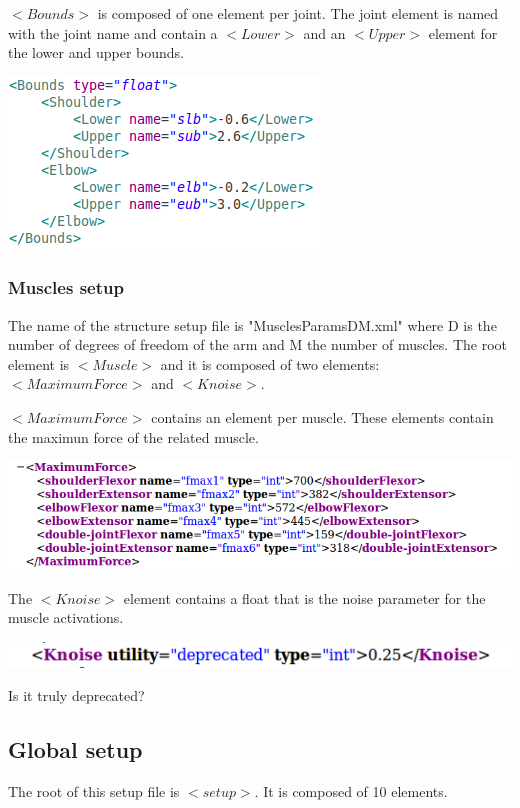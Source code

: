 \documentclass[a4paper]{article}
\begin{document}
$<Bounds>$ is composed of one element per joint. The joint element is named with the joint name and contain a $<Lower>$ and an $<Upper>$ element for the lower and upper bounds.
\begin{flushleft}
\includegraphics[scale=0.5]{XMLBounds.png}
\end{flushleft}
\subsubsection{Muscles setup}
The name of the structure setup file is "MusclesParamsDM.xml" where D is the number of degrees of freedom of the arm and M the number of muscles.
The root element is $<Muscle>$ and it is composed of two elements: $<MaximumForce>$ and $<Knoise>$.

$<MaximumForce>$ contains an element per muscle. These elements contain the maximun force of the related muscle.
\begin{flushleft}
\includegraphics[scale=0.5]{XMLForce.png}
\end{flushleft}
The $<Knoise>$ element contains a float that is the noise parameter for the muscle activations.
\begin{flushleft}
\includegraphics[scale=0.5]{XMLKnoise.png}
\end{flushleft}
Is it truly deprecated?

\subsection{Global setup}
\label{global}
The root of this setup file is $<setup>$. It is composed of 10 elements.
\end{document}
